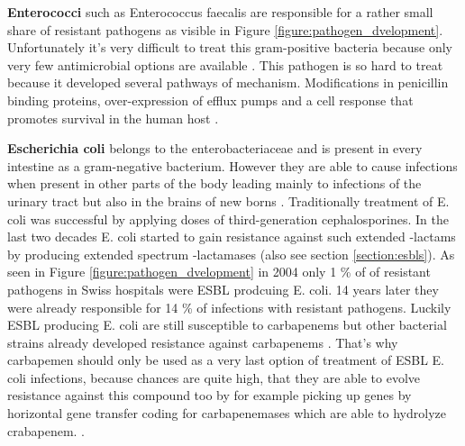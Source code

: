 \textbf{Enterococci} such as Enterococcus faecalis are responsible for a rather small share of resistant pathogens as visible in Figure \ref{figure:pathogen_dvelopment}. Unfortunately it's very difficult to treat this gram-positive bacteria because only very few antimicrobial options are available \cite{ventola_antibiotic_2015}. This pathogen is so hard to treat because it developed several pathways of mechanism. Modifications in penicillin binding proteins, over-expression of efflux pumps and a cell response that promotes survival in the human host \cite{miller_mechanisms_2014}.

\textbf{Escherichia coli} belongs to the enterobacteriaceae and is present in every intestine as a gram-negative bacterium. However they are able to cause infections when present in other parts of the body leading mainly to infections of the urinary tract but also in the brains of new borns \cite{swiss_hospitals_pathogens}. Traditionally treatment of E. coli was successful by applying doses of third-generation cephalosporines. In the last two decades E. coli started to gain resistance against such extended \textbeta-lactams by producing extended spectrum \textbeta-lactamases (also see section \ref{section:esbls}). As seen in Figure \ref{figure:pathogen_dvelopment} in 2004 only 1 \% of of resistant pathogens in Swiss hospitals were ESBL prodcuing E. coli. 14 years later they were already responsible for 14 \% of infections with resistant pathogens. Luckily ESBL producing E. coli are still susceptible to carbapenems but other bacterial strains already developed resistance against carbapenems \cite{noauthor_treatment_nodate}. That's why carbapemen should only be used as a very last option of treatment of ESBL E. coli infections, because chances are quite high, that they are able to evolve resistance against this compound too by for example picking up genes by horizontal gene transfer coding for carbapenemases which are able to hydrolyze crabapenem.  \cite{ventola_antibiotic_2015}. 


